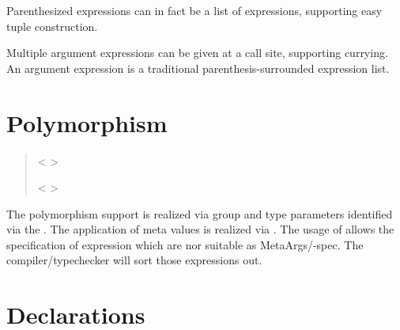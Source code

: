Parenthesized expressions can in fact be a list of expressions,
supporting easy tuple construction.

Multiple argument expressions can be given at a call
site, supporting currying.  An argument expression is a
traditional parenthesis-surrounded expression list.


\section{Polymorphism}

\begin{quote}


 <   >


 {}  


 {}

 {}

 {}


 <   >

\end{quote}

The polymorphism support is realized via group and type parameters
identified via the . The application of meta
values is realized via . The usage of
 allows the specification of expression which are
nor suitable as MetaArgs/-spec. The compiler/typechecker will sort
those expressions out.

\section{Declarations}

